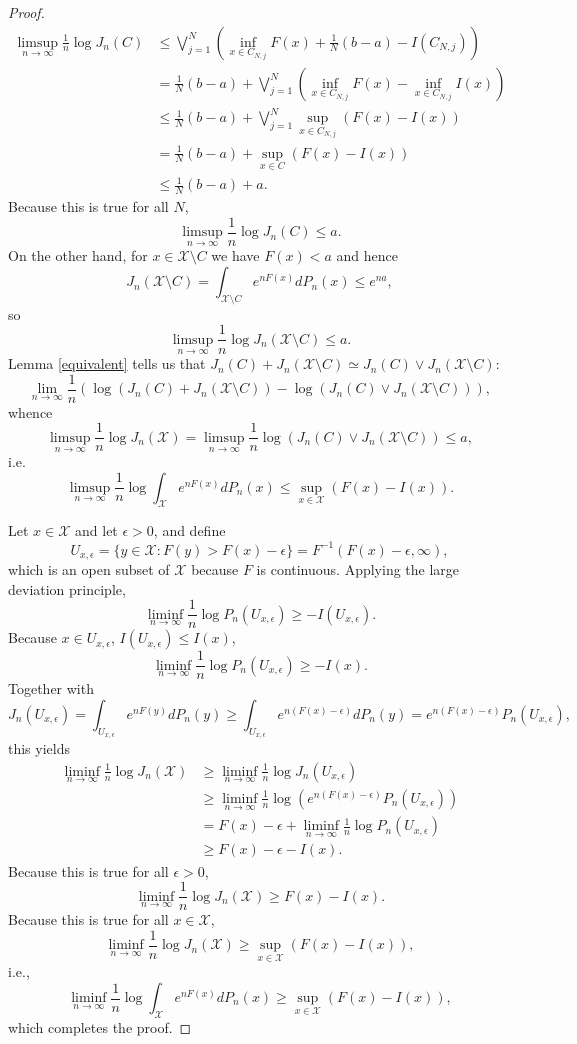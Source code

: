 \documentclass{article}
\theoremstyle{definition}
\begin{document}
\begin{proof}
\begin{align*}
\limsup_{n \to \infty} \frac{1}{n}\log J_n(C)& \leq   \bigvee_{j=1}^N \left( \inf_{x \in C_{N,j}} F(x) + \frac{1}{N}(b-a)
-I(C_{N,j})\right)\\
&=\frac{1}{N}(b-a)+ \bigvee_{j=1}^N \left( \inf_{x \in C_{N,j}} F(x) -  \inf_{x \in C_{N,j}} I(x) \right)\\
&\leq \frac{1}{N}(b-a)+ \bigvee_{j=1}^N \sup_{x \in C_{N,j}} (F(x)-I(x))\\
&= \frac{1}{N}(b-a)+\sup_{x \in C} (F(x)-I(x))\\
&\leq \frac{1}{N}(b-a)+a.
\end{align*}
Because this is true for all $N$,
\[
\limsup_{n \to \infty} \frac{1}{n}\log J_n(C) \leq a.
\]
On the other hand, for $x \in \mathcal{X} \setminus C$ we have 
$F(x)<a$ and hence
\[
J_n(\mathcal{X} \setminus C) = 
\int_{\mathcal{X} \setminus C} e^{nF(x)} dP_n(x)
\leq e^{na},
\]
so
\[
\limsup_{n \to \infty} \frac{1}{n} \log J_n(\mathcal{X} \setminus C)
\leq a.
\]
Lemma \ref{equivalent} tells us that $J_n(C)+J_n(\mathcal{X}\setminus C) \simeq 
J_n(C) \vee J_n(\mathcal{X} \setminus C)$:
\[
\lim_{n \to \infty} \frac{1}{n} (\log(J_n(C)+J_n(\mathcal{X}\setminus C)) - \log(J_n(C) \vee J_n(\mathcal{X} \setminus C))),
\]
whence
\[
\limsup_{n \to \infty} \frac{1}{n} \log J_n(\mathcal{X}) = \limsup_{n \to \infty} \frac{1}{n}
 \log(J_n(C) \vee J_n(\mathcal{X} \setminus C))
 \leq a,
\] 
i.e.
\[
\limsup_{n \to \infty} \frac{1}{n} \log \int_\mathcal{X} e^{nF(x)} dP_n(x) \leq \sup_{x \in \mathcal{X}} (F(x)-I(x)).
\]

Let $x \in \mathcal{X}$ and let $\epsilon>0$, and define
\[
U_{x,\epsilon} = \{y \in \mathcal{X}: F(y)>F(x)-\epsilon\}
=F^{-1}(F(x)-\epsilon,\infty),
\]
which is an open subset of $\mathcal{X}$ because $F$ is continuous. 
Applying the large deviation principle,
\[
\liminf_{n \to \infty} \frac{1}{n} \log P_n(U_{x,\epsilon}) \geq -I(U_{x,\epsilon}).
\]
Because $x \in U_{x,\epsilon}$, $I(U_{x,\epsilon}) \leq I(x)$,
\[
\liminf_{n \to \infty} \frac{1}{n} \log P_n(U_{x,\epsilon}) \geq -I(x).
\]
Together with
\[
J_n(U_{x,\epsilon}) = \int_{U_{x,\epsilon}} e^{nF(y)} dP_n(y)
\geq \int_{U_{x,\epsilon}} e^{n(F(x)-\epsilon)} dP_n(y)
= e^{n(F(x)-\epsilon)} P_n(U_{x,\epsilon}),
\]
this yields
\begin{align*}
\liminf_{n \to \infty} \frac{1}{n} \log J_n(\mathcal{X})&\geq \liminf_{n \to \infty} \frac{1}{n} \log J_n(U_{x,\epsilon})\\
&\geq \liminf_{n \to \infty} \frac{1}{n} \log \left(e^{n(F(x)-\epsilon)} P_n(U_{x,\epsilon})\right)\\
&=F(x)-\epsilon+\liminf_{n \to \infty} \frac{1}{n} \log P_n(U_{x,\epsilon})\\
&\geq F(x)-\epsilon-I(x).
\end{align*}
Because this is true for all $\epsilon>0$,
\[
\liminf_{n \to \infty} \frac{1}{n} \log J_n(\mathcal{X}) \geq F(x)-I(x).
\]
Because this is true for all $x \in \mathcal{X}$,
\[
\liminf_{n \to \infty} \frac{1}{n} \log J_n(\mathcal{X}) \geq \sup_{x \in \mathcal{X}} (F(x)-I(x)),
\]
i.e.,
\[
\liminf_{n \to \infty} \frac{1}{n} \log \int_\mathcal{X} e^{nF(x)} dP_n(x) \geq  \sup_{x \in \mathcal{X}} (F(x)-I(x)),
\]
which completes the proof.
\end{proof}
\end{document}

